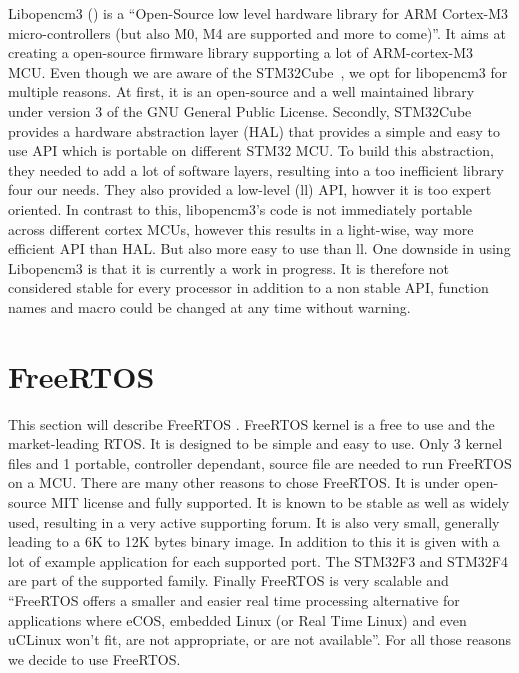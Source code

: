 \documentclass[12pt,a4paper]{report}
\begin{document}
\label{sec:libopencm3}
Libopencm3 (\cite{cm3}) is a ``Open-Source low level hardware library for ARM Cortex-M3 micro-controllers (but also M0, M4 are supported and more to come)''. It aims at creating a open-source firmware library supporting a lot of ARM-cortex-M3 MCU. Even though we are aware of the STM32Cube~\cite{cube}, we opt for libopencm3 for multiple reasons. At first, it is an open-source and a well maintained library under version 3 of the GNU General Public License. Secondly, STM32Cube provides a hardware abstraction layer (HAL) that provides a simple and easy to use API which  is portable on different STM32 MCU. To build this abstraction, they needed to add a lot of software layers, resulting into a too inefficient library four our needs. They also provided a low-level (ll) API, howver it is too expert oriented. In contrast to this, libopencm3's code is not immediately portable across different cortex MCUs, however this results in a light-wise, way more efficient API than HAL. But also more easy to use than ll.\newline
One downside in using Libopencm3 is that it is currently a work in progress. It is therefore not considered stable for every processor in addition to a non stable API, function names and macro could be changed at any time without warning.\newpage
\section{FreeRTOS}

\label{sec:freeRTOS}
This section will describe FreeRTOS \cite{FreeRTOSBook}. FreeRTOS kernel is a free to use and the market-leading RTOS. It is designed to be simple and easy to use. Only 3 kernel files and 1 portable, controller dependant, source file are needed to run FreeRTOS on a MCU. There are many other reasons to chose FreeRTOS. It is under open-source MIT license and fully supported. It is known to be stable as well as widely used, resulting in a very active supporting forum. It is also very small, generally leading to a 6K to 12K bytes binary image. In addition to this it is given with a lot of example application for each supported port. The STM32F3 and STM32F4 are part of the supported family. Finally FreeRTOS is very scalable and ``FreeRTOS offers a smaller and easier real time processing alternative for applications where eCOS, embedded Linux (or Real Time Linux) and even uCLinux won't fit, are not appropriate, or are not available''.\newline
For all those reasons we decide to use FreeRTOS.
\end{document}
